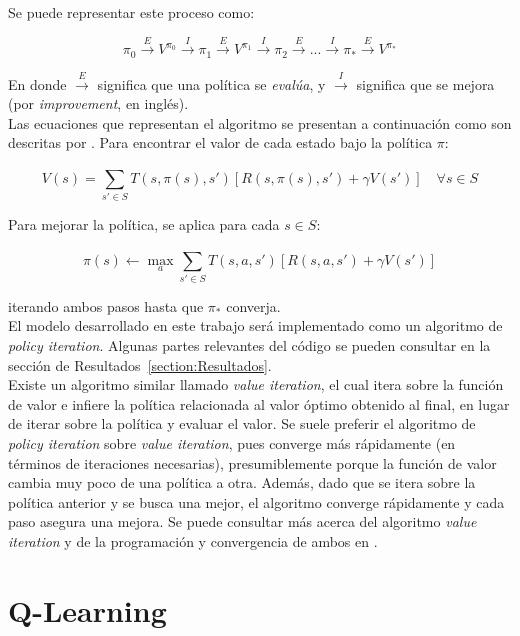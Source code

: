 Se puede representar este proceso como:

$$
\pi_0 \overset{E}{\rightarrow} V^{\pi_{0}} \overset{I}{\rightarrow}
\pi_1 \overset{E}{\rightarrow} V^{\pi_{1}} \overset{I}{\rightarrow}
\pi_2 \overset{E}{\rightarrow} 
...
\overset{I}{\rightarrow} \pi_{*} \overset{E}{\rightarrow} V^{\pi_{*}}
$$

En donde $\overset{E}{\rightarrow}$ significa que una pol\'itica se \textit{eval\'ua}, y $\overset{I}{\rightarrow}$ significa que se mejora (por \textit{improvement}, en ingl\'es). \\

Las ecuaciones que representan el algoritmo se presentan a continuaci\'on como son descritas por \citet{Frazzoli}. Para encontrar el valor de cada estado bajo la pol\'itica $\pi$:

$$
V(s) = \sum_{s' \in S}^{ } T(s, \pi(s), s')[R(s, \pi(s), s') + \gamma V(s')] \quad \forall s \in S
$$

Para mejorar la pol\'itica, se aplica para cada $s \in S$:

$$
\pi(s) \leftarrow \max_a \sum_{s' \in S}^{ }T(s,a,s')[R(s,a,s') + \gamma V(s')]
$$

iterando ambos pasos hasta que $\pi_*$ converja.\\

El modelo desarrollado en este trabajo ser\'a implementado como un algoritmo de \textit{policy iteration}. Algunas partes relevantes del c\'odigo se pueden consultar en la secci\'on de Resultados~\ref{section:Resultados}.\\

Existe un algoritmo similar llamado \textit{value iteration}, el cual itera sobre la funci\'on de valor e infiere la pol\'itica relacionada al valor \'optimo obtenido al final, en lugar de iterar sobre la pol\'itica y evaluar el valor. Se suele preferir el algoritmo de \textit{policy iteration} sobre \textit{value iteration}, pues converge m\'as r\'apidamente (en t\'erminos de iteraciones necesarias), presumiblemente porque la funci\'on de valor cambia muy poco de una pol\'itica a otra. Adem\'as, dado que se itera sobre la pol\'itica anterior y se busca una mejor, el algoritmo converge r\'apidamente y cada paso asegura una mejora. Se puede consultar m\'as acerca del algoritmo \textit{value iteration} y de la programaci\'on y convergencia de ambos en \citet{Sutton}.

\section{Q-Learning}

